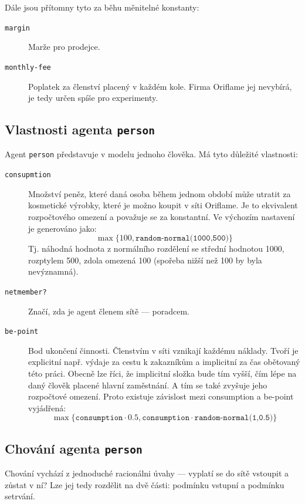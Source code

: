 \documentclass[a4wide,12pt]{report}
\begin{document}
Dále jsou přítomny tyto za běhu měnitelné konstanty:
\begin{description}
\item[\texttt{margin}] Marže pro prodejce.
\item[\texttt{monthly-fee}] Poplatek za členství placený v každém kole. Firma Oriflame jej nevybírá, je tedy určen spíše pro experimenty.
\end{description}
\subsection{Vlastnosti agenta \texttt{person}}
Agent \texttt{person} představuje v modelu jednoho člověka. Má tyto důležité vlastnosti:
\begin{description}
\item[\texttt{consupmtion}] Množství peněz, které daná osoba během jednom období může utratit za kosmetické výrobky, které je možno koupit v síti Oriflame. Je to ekvivalent rozpočtového omezení a považuje se za konstantní. Ve výchozím nastavení je generováno jako:
$$\max\{100,\texttt{random-normal(1000,500)}\}$$
Tj. náhodná hodnota z normálního rozdělení se střední hodnotou 1000, rozptylem 500, zdola omezená 100 (spořeba nižší než 100 by byla nevýznamná).
\item[\texttt{netmember?}] Značí, zda je agent členem sítě --- poradcem.
\item[\texttt{be-point}] Bod ukončení činnosti. Členstvím v síti vznikají každému náklady. Tvoří je explicitní např. výdaje za cestu k zakazníkům a implicitní za čas obětovaný této práci. Obecně lze říci, že implicitní složka bude tím vyšší, čím lépe na daný člověk placené hlavní zaměstnání. A tím se také zvyšuje jeho rozpočtové omezení. Proto existuje závislost mezi consumption a be-point vyjádřená:
$$\max\{\texttt{consumption}\cdot 0.5,\texttt{consumption}\cdot\texttt{random-normal(1,0.5)}\}$$
\end{description}
\subsection{Chování agenta \texttt{person}}
Chování vychází z jednoduché racionálni úvahy --- vyplatí se do sítě vstoupit a zůstat v ní? Lze jej tedy rozdělit na dvě části: podmínku vstupní a podmínku setrvání.
\end{document}
